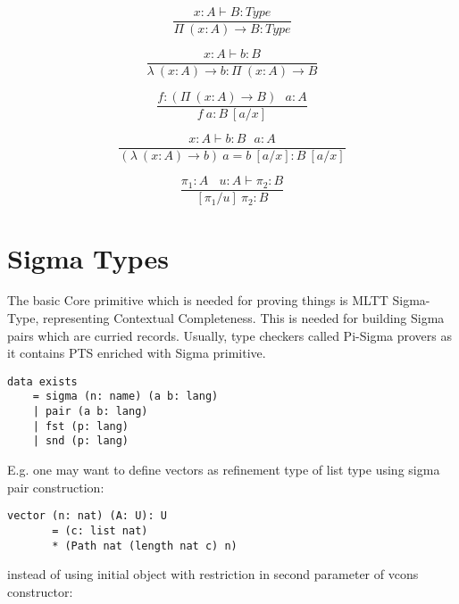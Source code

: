 \documentclass{aip-cp}
\begin{document}
\begin{equation}
\tag{$\Pi$-formation}
\dfrac
{x:A \vdash B : Type}
{\Pi\ (x:A) \rightarrow B : Type}
\end{equation}

\begin{equation}
\tag{$\lambda$-intro}
\dfrac
{x:A \vdash b : B}
{\lambda\ (x:A) \rightarrow b : \Pi\ (x: A) \rightarrow B }
\end{equation}

\begin{equation}
\tag{$App$-elimination}
\dfrac
{f: (\Pi\ (x:A) \rightarrow B)\ \ \ a: A}
{f\ a : B\ [a/x]}
\end{equation}

\begin{equation}
\tag{$\beta$-computation}
\dfrac
{x:A \vdash b: B\ \ \ a:A}
{(\lambda\ (x:A) \rightarrow b)\ a = b\ [a/x] : B\ [a/x]}
\end{equation}

\begin{equation}
\tag{subst}
\dfrac
{\pi_1 : A\ \ \ \ u:A \vdash \pi_2 : B}
{[\pi_1/u]\ \pi_2 : B}
\end{equation}

\section{Sigma Types}

The basic Core primitive which is needed for proving things
is MLTT Sigma-Type, representing Contextual Completeness.
This is needed for building Sigma pairs which are curried
records. Usually, type checkers called Pi-Sigma provers
as it contains PTS enriched with Sigma primitive.

\begin{lstlisting}[mathescape=true]
data exists
    = sigma (n: name) (a b: lang)
    | pair (a b: lang)
    | fst (p: lang)
    | snd (p: lang)
\end{lstlisting}

E.g. one may want to define vectors as refinement type of list type using sigma pair construction:

\begin{lstlisting}[mathescape=true]
    vector (n: nat) (A: U): U
       = (c: list nat)
       * (Path nat (length nat c) n)
\end{lstlisting}

instead of using initial object with restriction in second parameter of vcons constructor:
\end{document}
